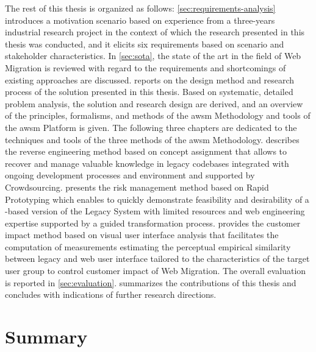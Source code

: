 The rest of this thesis is organized as follows: \cref{sec:requirements-analysis} introduces a motivation scenario based on experience from a three-years industrial research project in the context of which the research presented in this thesis was conducted, and it elicits six requirements based on scenario and stakeholder characteristics.
In \cref{sec:sota}, the state of the art in the field of \gls{Web Migration} is reviewed with regard to the requirements and shortcomings of existing approaches are discussed.
 reports on the design method and research process of the solution presented in this thesis.
Based on systematic, detailed problem analysis, the solution and research design are derived, and an overview of the principles, formalisms, and methods of the \gls{awsm} Methodology and tools of the \gls{awsm} Platform is given.
The following three chapters are dedicated to the techniques and tools of the three methods of the \gls{awsm} Methodology.
 describes the reverse engineering method based on concept assignment that allows to recover and manage valuable knowledge in legacy codebases integrated with ongoing development processes and environment and supported by \gls{Crowdsourcing}.
 presents the risk management method based on \gls{Rapid Prototyping} which enables to quickly demonstrate feasibility and desirability of a -based version of the \gls{Legacy System} with limited resources and web engineering expertise supported by a guided transformation process.
 provides the customer impact method based on visual user interface analysis that facilitates the computation of measurements estimating the perceptual empirical similarity between legacy and \Gls{web} user interface tailored to the characteristics of the target user group to control customer impact of \gls{Web Migration}.
The overall evaluation is reported in \cref{sec:evaluation}.
 summarizes the contributions of this thesis and concludes with indications of further research directions.

\hypertarget{summary}{%
\section{Summary}\label{summary}}

